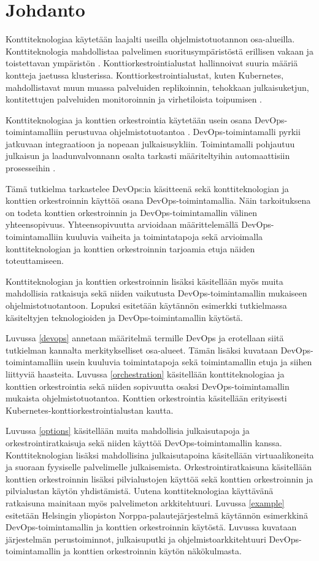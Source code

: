 \chapter{Johdanto\label{intro}}

Konttiteknologiaa käytetään laajalti useilla ohjelmistotuotannon osa-alueilla.
Konttiteknologia mahdollistaa palvelimen suoritusympäristöstä erillisen vakaan ja toistettavan ympäristön \cite{Watada19}.
Konttiorkestrointialustat hallinnoivat suuria määriä kontteja jaetussa klusterissa.
Konttiorkestrointialustat, kuten Kubernetes, mahdollistavat muun muassa palveluiden replikoinnin, tehokkaan julkaisuketjun, kontitettujen palveluiden monitoroinnin ja virhetiloista toipumisen \cite{Khan17}.

Konttiteknologiaa ja konttien orkestrointia käytetään usein osana DevOps-toimintamalliin perustuvaa ohjelmistotuotantoa \cite{Kang16, Narasimhulu23}.
DevOps-toimintamalli pyrkii jatkuvaan integraatioon ja nopeaan julkaisusykliin.
Toimintamalli pohjautuu julkaisun ja laadunvalvonnann osalta tarkasti määriteltyihin automaattisiin prosesseihin \cite{Jabbari16}.

Tämä tutkielma tarkastelee DevOps:ia käsitteenä sekä konttiteknologian ja konttien orkestroinnin käyttöä osana DevOps-toimintamallia.
Näin tarkoituksena on todeta konttien orkestroinnin ja DevOps-toimintamallin välinen yhteensopivuus.
Yhteensopivuutta arvioidaan määrittelemällä DevOps-toimintamalliin kuuluvia vaiheita ja toimintatapoja sekä arvioimalla konttiteknologian ja konttien orkestroinnin tarjoamia etuja näiden toteuttamiseen.

Konttiteknologian ja konttien orkestroinnin lisäksi käsitellään myös muita mahdollisia ratkaisuja sekä niiden vaikutusta DevOps-toimintamallin mukaiseen ohjelmistotuotantoon.
Lopuksi esitetään käytännön esimerkki tutkielmassa käsiteltyjen teknologioiden ja DevOps-toimintamallin käytöstä.

Luvussa \ref{devops} annetaan määritelmä termille DevOps ja erotellaan siitä tutkielman kannalta merkitykselliset osa-alueet.
Tämän lisäksi kuvataan DevOps-toimintamalliin usein kuuluvia toimintatapoja sekä toimintamallin etuja ja siihen liittyviä haasteita.
Luvussa \ref{orchestration} käsitellään konttiteknologiaa ja konttien orkestrointia sekä niiden sopivuutta osaksi DevOps-toimintamallin mukaista ohjelmistotuotantoa.
Konttien orkestrointia käsitellään erityisesti Kubernetes-konttiorkestrointialustan kautta.

Luvussa \ref{options} käsitellään muita mahdollisia julkaisutapoja ja orkestrointiratkaisuja sekä niiden käyttöä DevOps-toimintamallin kanssa.
Konttiteknologian lisäksi mahdollisina julkaisutapoina käsitellään virtuaalikoneita ja suoraan fyysiselle palvelimelle julkaisemista.
Orkestrointiratkaisuna käsitellään konttien orkestroinnin lisäksi pilvialustojen käyttöä sekä konttien orkestroinnin ja pilvialustan käytön yhdistämistä.
Uutena konttiteknologiaa käyttävänä ratkaisuna mainitaan myös palvelimeton arkkitehtuuri.
Luvussa \ref{example} esitetään Helsingin yliopiston Norppa-palautejärjestelmä käytännön esimerkkinä DevOps-toimintamallin ja konttien orkestroinnin käytöstä.
Luvussa kuvataan järjestelmän perustoiminnot, julkaisuputki ja ohjelmistoarkkitehtuuri DevOps-toimintamallin ja konttien orkestroinnin käytön näkökulmasta.
